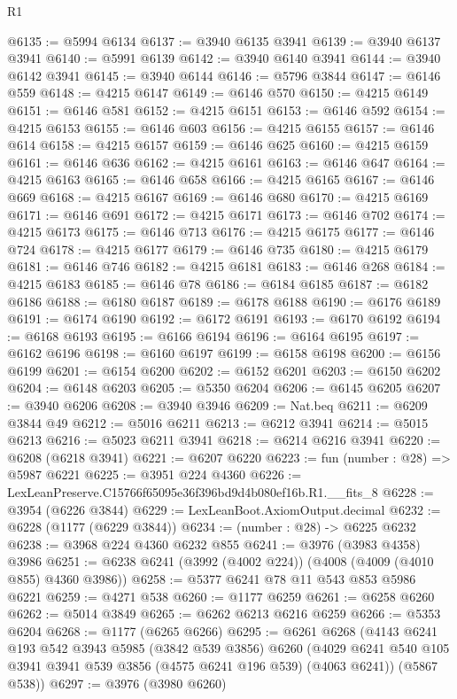 \begin{lexlean}{R1}
\begin{coremodule}
@6135 := @5994 @6134
@6137 := @3940 @6135 @3941
@6139 := @3940 @6137 @3941
@6140 := @5991 @6139
@6142 := @3940 @6140 @3941
@6144 := @3940 @6142 @3941
@6145 := @3940 @6144
@6146 := @5796 @3844
@6147 := @6146 @559
@6148 := @4215 @6147
@6149 := @6146 @570
@6150 := @4215 @6149
@6151 := @6146 @581
@6152 := @4215 @6151
@6153 := @6146 @592
@6154 := @4215 @6153
@6155 := @6146 @603
@6156 := @4215 @6155
@6157 := @6146 @614
@6158 := @4215 @6157
@6159 := @6146 @625
@6160 := @4215 @6159
@6161 := @6146 @636
@6162 := @4215 @6161
@6163 := @6146 @647
@6164 := @4215 @6163
@6165 := @6146 @658
@6166 := @4215 @6165
@6167 := @6146 @669
@6168 := @4215 @6167
@6169 := @6146 @680
@6170 := @4215 @6169
@6171 := @6146 @691
@6172 := @4215 @6171
@6173 := @6146 @702
@6174 := @4215 @6173
@6175 := @6146 @713
@6176 := @4215 @6175
@6177 := @6146 @724
@6178 := @4215 @6177
@6179 := @6146 @735
@6180 := @4215 @6179
@6181 := @6146 @746
@6182 := @4215 @6181
@6183 := @6146 @268
@6184 := @4215 @6183
@6185 := @6146 @78
@6186 := @6184 @6185
@6187 := @6182 @6186
@6188 := @6180 @6187
@6189 := @6178 @6188
@6190 := @6176 @6189
@6191 := @6174 @6190
@6192 := @6172 @6191
@6193 := @6170 @6192
@6194 := @6168 @6193
@6195 := @6166 @6194
@6196 := @6164 @6195
@6197 := @6162 @6196
@6198 := @6160 @6197
@6199 := @6158 @6198
@6200 := @6156 @6199
@6201 := @6154 @6200
@6202 := @6152 @6201
@6203 := @6150 @6202
@6204 := @6148 @6203
@6205 := @5350 @6204
@6206 := @6145 @6205
@6207 := @3940 @6206
@6208 := @3940 @3946
@6209 := Nat.beq
@6211 := @6209 @3844 @49
@6212 := @5016 @6211
@6213 := @6212 @3941
@6214 := @5015 @6213
@6216 := @5023 @6211 @3941
@6218 := @6214 @6216 @3941
@6220 := @6208 (@6218 @3941)
@6221 := @6207 @6220
@6223 := fun (number : @28) => @5987 @6221
@6225 := @3951 @224 @4360
@6226 := LexLeanPreserve.C15766f65095e36f396bd9d4b080ef16b.R1.__fits_8
@6228 := @3954 (@6226 @3844)
@6229 := LexLeanBoot.AxiomOutput.decimal
@6232 := @6228 (@1177 (@6229 @3844))
@6234 := (number : @28) -> @6225 @6232
@6238 := @3968 @224 @4360 @6232 @855
@6241 := @3976 (@3983 @4358) @3986
@6251 := @6238 @6241 (@3992 (@4002 @224)) (@4008 (@4009 (@4010 @855) @4360 @3986))
@6258 := @5377 @6241 @78 @11 @543 @853 @5986 @6221
@6259 := @4271 @538
@6260 := @1177 @6259
@6261 := @6258 @6260
@6262 := @5014 @3849
@6265 := @6262 @6213 @6216 @6259
@6266 := @5353 @6204
@6268 := @1177 (@6265 @6266)
@6295 := @6261
    @6268
    (@4143
      @6241
      @193
      @542
      @3943
      @5985
      (@3842 @539 @3856)
      @6260
      (@4029 @6241 @540 @105 @3941 @3941 @539 @3856 (@4575 @6241 @196 @539) (@4063 @6241))
      (@5867 @538))
@6297 := @3976 (@3980 @6260)

\end{coremodule}
\end{lexlean}

